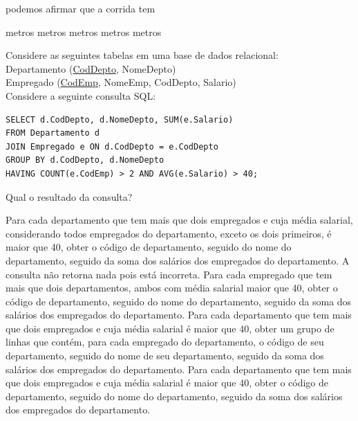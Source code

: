 \documentclass[12pt, addpoints]{exam}
\begin{document}
\begin{questions}
podemos afirmar que a corrida tem
\begin{choices}
 metros
 metros
 metros
 metros
 metros
\end{choices}

\question
Considere as seguintes tabelas em uma base de dados relacional:\\
Departamento (\underline{CodDepto}, NomeDepto)\\
Empregado (\underline{CodEmp}, NomeEmp, CodDepto, Salario)\\
Considere a seguinte consulta SQL:
\begin{verbatim}
SELECT d.CodDepto, d.NomeDepto, SUM(e.Salario)
FROM Departamento d
JOIN Empregado e ON d.CodDepto = e.CodDepto
GROUP BY d.CodDepto, d.NomeDepto
HAVING COUNT(e.CodEmp) > 2 AND AVG(e.Salario) > 40;
\end{verbatim}

Qual o resultado da consulta?
\begin{choices}
\choice Para cada departamento que tem mais que dois empregados e cuja média salarial, considerando todos empregados do departamento, exceto os dois primeiros, é maior que 40, obter o código de departamento, seguido do nome do departamento, seguido da soma dos salários dos empregados do departamento.
\choice A consulta não retorna nada pois está incorreta.
\choice Para cada empregado que tem mais que dois departamentos, ambos com média salarial maior que 40, obter o código de departamento, seguido do nome do departamento, seguido da soma dos salários dos empregados do departamento.
\choice Para cada departamento que tem mais que dois empregados e cuja média salarial é maior que 40, obter um grupo de linhas que contém, para cada empregado do departamento, o código de seu departamento, seguido do nome de seu departamento, seguido da soma dos salários dos empregados do departamento.
\choice Para cada departamento que tem mais que dois empregados e cuja média salarial é maior que 40, obter o código de departamento, seguido do nome do departamento, seguido da soma dos salários dos empregados do departamento.
\end{choices}


\end{questions}
\end{document}
